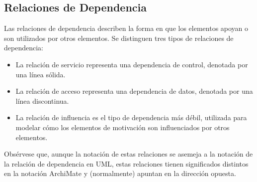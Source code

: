 \subsection{Relaciones de Dependencia}

Las relaciones de dependencia describen la forma en que los elementos apoyan o son utilizados por otros elementos.  Se distinguen tres tipos de relaciones de dependencia:
\begin{itemize}
	\item La relación de servicio representa una dependencia de control, denotada por una línea sólida.
	\item La relación de acceso representa una dependencia de datos, denotada por una línea discontinua.
	\item La relación de influencia es el tipo de dependencia más débil, utilizada para modelar cómo los elementos de motivación son influenciados por otros elementos.
\end{itemize}
Obsérvese que, aunque la notación de estas relaciones se asemeja a la notación de la relación de dependencia en UML, estas relaciones tienen significados distintos en la notación ArchiMate y (normalmente) apuntan en la dirección opuesta.

